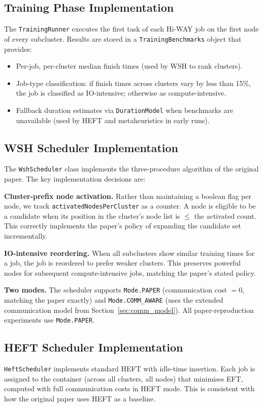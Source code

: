 \documentclass[12pt,a4paper]{article}
\begin{document}
\subsection{Training Phase Implementation}
The \texttt{TrainingRunner} executes the first task of each Hi-WAY job on the first node of every subcluster. Results are stored in a \texttt{TrainingBenchmarks} object that provides:
\begin{itemize}[leftmargin=1.5cm]
    \item Per-job, per-cluster median finish times (used by WSH to rank clusters).
    \item Job-type classification: if finish times across clusters vary by less than 15\%, the job is classified as IO-intensive; otherwise as compute-intensive.
    \item Fallback duration estimates via \texttt{DurationModel} when benchmarks are unavailable (used by HEFT and metaheuristics in early runs).
\end{itemize}

\subsection{WSH Scheduler Implementation}
The \texttt{WshScheduler} class implements the three-procedure algorithm of the original paper. The key implementation decisions are:

\textbf{Cluster-prefix node activation.} Rather than maintaining a boolean flag per node, we track \texttt{activatedNodesPerCluster} as a counter. A node is eligible to be a candidate when its position in the cluster's node list is $\leq$ the activated count. This correctly implements the paper's policy of expanding the candidate set incrementally.

\textbf{IO-intensive reordering.} When all subclusters show similar training times for a job, the job is reordered to prefer weaker clusters. This preserves powerful nodes for subsequent compute-intensive jobs, matching the paper's stated policy.

\textbf{Two modes.} The scheduler supports \texttt{Mode.PAPER} (communication cost $= 0$, matching the paper exactly) and \texttt{Mode.COMM\_AWARE} (uses the extended communication model from Section~\ref{sec:comm_model}). All paper-reproduction experiments use \texttt{Mode.PAPER}.

\subsection{HEFT Scheduler Implementation}
\texttt{HeftScheduler} implements standard HEFT with idle-time insertion. Each job is assigned to the container (across all clusters, all nodes) that minimises EFT, computed with full communication costs in HEFT mode. This is consistent with how the original paper uses HEFT as a baseline.
\end{document}
